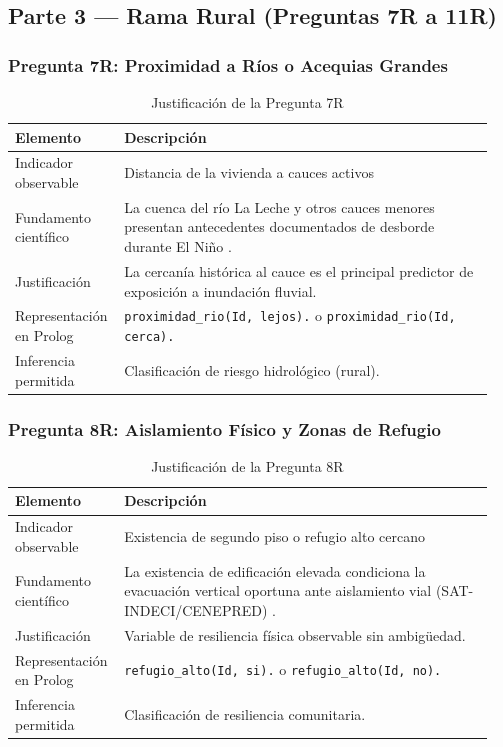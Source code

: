 \documentclass[12pt, letterpaper]{article}
\begin{document}
\subsection{Parte 3 — Rama Rural (Preguntas 7R a 11R)}

\subsubsection*{Pregunta 7R: Proximidad a Ríos o Acequias Grandes}
\begin{table}[H]
\centering
\caption{Justificación de la Pregunta 7R}
\label{tab:p7r}
\begin{tabular}{@{}p{0.2\linewidth}p{0.75\linewidth}@{}}
\toprule
\textbf{Elemento} & \textbf{Descripción} \\ \midrule
Indicador observable & Distancia de la vivienda a cauces activos \\
Fundamento científico & La cuenca del río La Leche y otros cauces menores presentan antecedentes documentados de desborde durante El Niño \parencite{gob_regional_lambayeque_2023}. \\
Justificación & La cercanía histórica al cauce es el principal predictor de exposición a inundación fluvial. \\
Representación en Prolog & \texttt{proximidad\_rio(Id, lejos).} o \texttt{proximidad\_rio(Id, cerca).} \\
Inferencia permitida & Clasificación de riesgo hidrológico (rural). \\ \bottomrule
\end{tabular}
\end{table}

\subsubsection*{Pregunta 8R: Aislamiento Físico y Zonas de Refugio}
\begin{table}[H]
\centering
\caption{Justificación de la Pregunta 8R}
\label{tab:p8r}
\begin{tabular}{@{}p{0.2\linewidth}p{0.75\linewidth}@{}}
\toprule
\textbf{Elemento} & \textbf{Descripción} \\ \midrule
Indicador observable & Existencia de segundo piso o refugio alto cercano \\
Fundamento científico & La existencia de edificación elevada condiciona la evacuación vertical oportuna ante aislamiento vial (SAT-INDECI/CENEPRED) \parencite{cenepred_manual_evar}. \\
Justificación & Variable de resiliencia física observable sin ambigüedad. \\
Representación en Prolog & \texttt{refugio\_alto(Id, si).} o \texttt{refugio\_alto(Id, no).} \\
Inferencia permitida & Clasificación de resiliencia comunitaria. \\ \bottomrule
\end{tabular}
\end{table}
\end{document}
